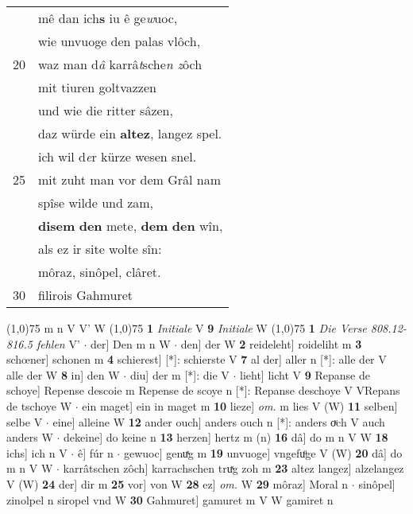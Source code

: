 \documentclass[8pt,a4paper,notitlepage]{article}
\begin{document}
\begin{table}[ht]
\begin{minipage}[t]{0.5\linewidth}
\begin{tabular}{rl}
 & mê dan ich\textbf{s} iu ê ge\textit{w}uoc,\\ 
 & wie unvuoge den palas vlôch,\\ 
20 & waz man d\textit{â} karrâ\textit{t}sche\textit{n z}ôch\\ 
 & mit tiuren goltvazzen\\ 
 & und wie die ritter sâzen,\\ 
 & daz würde ein \textbf{altez}, langez spel.\\ 
 & ich wil d\textit{e}r kürze wesen snel.\\ 
25 & mit zuht man vor dem Grâl nam\\ 
 & spîse wilde und zam,\\ 
 & \textbf{disem} \textbf{den} mete, \textbf{dem} \textbf{den} wîn,\\ 
 & als ez ir site wolte sîn:\\ 
 & môraz, sinôpel, clâret.\\ 
30 & filirois Gahmuret\\ 
\end{tabular}
\scriptsize
\line(1,0){75} \newline
m n V V' W \newline
\line(1,0){75} \newline
\textbf{1} \textit{Initiale} V  \textbf{9} \textit{Initiale} W  \newline
\line(1,0){75} \newline
\textbf{1} \textit{Die Verse 808.12-816.5 fehlen} V'   $\cdot$ der] Den m n W  $\cdot$ den] der W \textbf{2} reideleht] roideliht m \textbf{3} schœner] schonen m \textbf{4} schierest] [*]: schierste V \textbf{7} al der] aller n [*]: alle der V alle der W \textbf{8} in] den W  $\cdot$ diu] der m [*]: die V  $\cdot$ lieht] licht V \textbf{9} Repanse de schoye] Repense descoie m Repense de scoye n [*]: Repanse deschoye V VRepans de tschoye W  $\cdot$ ein maget] ein in maget m \textbf{10} lieze] \textit{om.} m lies V (W) \textbf{11} selben] selbe V  $\cdot$ eine] alleine W \textbf{12} ander ouch] anders ouch n [*]: anders oͮch V auch anders W  $\cdot$ dekeine] do keine n \textbf{13} herzen] hertz m (n) \textbf{16} dâ] do m n V W \textbf{18} ichs] ich n V  $\cdot$ ê] fúr n  $\cdot$ gewuoc] genuͯg m \textbf{19} unvuoge] vngefuͦge V (W) \textbf{20} dâ] do m n V W  $\cdot$ karrâtschen zôch] karrachschen truͯg zoh m \textbf{23} altez langez] alzelangez V (W) \textbf{24} der] dir m \textbf{25} vor] von W \textbf{28} ez] \textit{om.} W \textbf{29} môraz] Moral n  $\cdot$ sinôpel] zinolpel n siropel vnd W \textbf{30} Gahmuret] gamuret m V W gamiret n \newline
\end{minipage}
\end{table}
\end{document}
